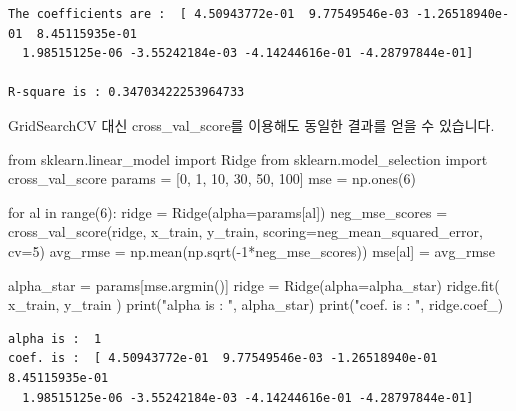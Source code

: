 \documentclass[
  letterpaper,
  DIV=11,
  numbers=noendperiod]{scrartcl}
\newenvironment{Shaded}{\begin{snugshade}}{\end{snugshade}}
\newcommand{\BuiltInTok}[1]{\textcolor[rgb]{0.00,0.23,0.31}{#1}}
\newcommand{\ControlFlowTok}[1]{\textcolor[rgb]{0.00,0.23,0.31}{#1}}
\newcommand{\DecValTok}[1]{\textcolor[rgb]{0.68,0.00,0.00}{#1}}
\newcommand{\ImportTok}[1]{\textcolor[rgb]{0.00,0.46,0.62}{#1}}
\newcommand{\KeywordTok}[1]{\textcolor[rgb]{0.00,0.23,0.31}{#1}}
\newcommand{\NormalTok}[1]{\textcolor[rgb]{0.00,0.23,0.31}{#1}}
\newcommand{\OperatorTok}[1]{\textcolor[rgb]{0.37,0.37,0.37}{#1}}
\newcommand{\StringTok}[1]{\textcolor[rgb]{0.13,0.47,0.30}{#1}}
\begin{document}
\begin{verbatim}
The coefficients are :  [ 4.50943772e-01  9.77549546e-03 -1.26518940e-01  8.45115935e-01
  1.98515125e-06 -3.55242184e-03 -4.14244616e-01 -4.28797844e-01] 

R-square is : 0.34703422253964733
\end{verbatim}

\begin{tcolorbox}[enhanced jigsaw, colframe=quarto-callout-color-frame, opacityback=0, colback=white, arc=.35mm, breakable, toprule=.15mm, left=2mm, leftrule=.75mm, bottomrule=.15mm, rightrule=.15mm]

GridSearchCV 대신 cross\_val\_score를 이용해도 동일한 결과를 얻을 수
있습니다.

\begin{Shaded}
\begin{Highlighting}[]
\ImportTok{from}\NormalTok{ sklearn.linear\_model }\ImportTok{import}\NormalTok{ Ridge}
\ImportTok{from}\NormalTok{ sklearn.model\_selection }\ImportTok{import}\NormalTok{ cross\_val\_score}
\NormalTok{params }\OperatorTok{=}\NormalTok{ [}\DecValTok{0}\NormalTok{, }\DecValTok{1}\NormalTok{, }\DecValTok{10}\NormalTok{, }\DecValTok{30}\NormalTok{, }\DecValTok{50}\NormalTok{, }\DecValTok{100}\NormalTok{]}
\NormalTok{mse }\OperatorTok{=}\NormalTok{ np.ones(}\DecValTok{6}\NormalTok{)}

\ControlFlowTok{for}\NormalTok{ al }\KeywordTok{in} \BuiltInTok{range}\NormalTok{(}\DecValTok{6}\NormalTok{):}
\NormalTok{    ridge }\OperatorTok{=}\NormalTok{ Ridge(alpha}\OperatorTok{=}\NormalTok{params[al])}
\NormalTok{    neg\_mse\_scores }\OperatorTok{=}\NormalTok{ cross\_val\_score(ridge, x\_train, y\_train,}
\NormalTok{    scoring}\OperatorTok{=}\StringTok{\textquotesingle{}neg\_mean\_squared\_error\textquotesingle{}}\NormalTok{, cv}\OperatorTok{=}\DecValTok{5}\NormalTok{)}
\NormalTok{    avg\_rmse }\OperatorTok{=}\NormalTok{ np.mean(np.sqrt(}\OperatorTok{{-}}\DecValTok{1}\OperatorTok{*}\NormalTok{neg\_mse\_scores))}
\NormalTok{    mse[al] }\OperatorTok{=}\NormalTok{ avg\_rmse}

\NormalTok{alpha\_star }\OperatorTok{=}\NormalTok{ params[mse.argmin()]}
\NormalTok{ridge }\OperatorTok{=}\NormalTok{ Ridge(alpha}\OperatorTok{=}\NormalTok{alpha\_star)}
\NormalTok{ridge.fit( x\_train, y\_train )}
\BuiltInTok{print}\NormalTok{(}\StringTok{"alpha is : "}\NormalTok{, alpha\_star)}
\BuiltInTok{print}\NormalTok{(}\StringTok{"coef. is : "}\NormalTok{, ridge.coef\_)}
\end{Highlighting}
\end{Shaded}

\begin{verbatim}
alpha is :  1
coef. is :  [ 4.50943772e-01  9.77549546e-03 -1.26518940e-01  8.45115935e-01
  1.98515125e-06 -3.55242184e-03 -4.14244616e-01 -4.28797844e-01]
\end{verbatim}

\end{tcolorbox}
\end{document}
